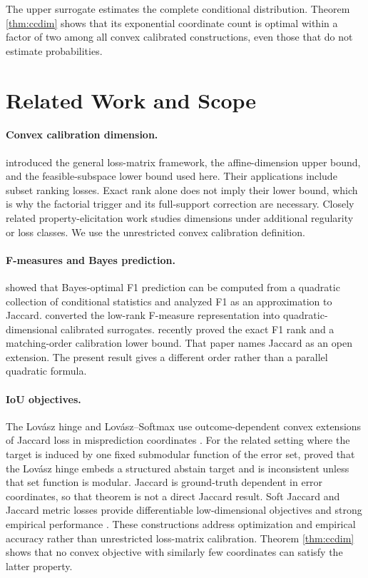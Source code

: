 \documentclass[twoside]{article}
\newcommand{\1}{\mathbf 1}
\begin{document}
The upper surrogate estimates the complete conditional distribution. Theorem \ref{thm:ccdim} shows that its exponential coordinate count is optimal within a factor of two among all convex calibrated constructions, even those that do not estimate probabilities.

\section{Related Work and Scope}

\paragraph{Convex calibration dimension.} \citet{ramaswamy2016convex} introduced the general loss-matrix framework, the affine-dimension upper bound, and the feasible-subspace lower bound used here. Their applications include subset ranking losses. Exact rank alone does not imply their lower bound, which is why the factorial trigger and its full-support correction are necessary. Closely related property-elicitation work studies dimensions under additional regularity or loss classes. We use the unrestricted convex calibration definition.

\paragraph{F-measures and Bayes prediction.} \citet{waegeman2014bayes} showed that Bayes-optimal F1 prediction can be computed from a quadratic collection of conditional statistics and analyzed F1 as an approximation to Jaccard. \citet{zhang2020convex} converted the low-rank F-measure representation into quadratic-dimensional calibrated surrogates. \citet{zhang2026exact} recently proved the exact F1 rank and a matching-order calibration lower bound. That paper names Jaccard as an open extension. The present result gives a different order rather than a parallel quadratic formula.

\paragraph{IoU objectives.} The Lov\'asz hinge and Lov\'asz--Softmax use outcome-dependent convex extensions of Jaccard loss in misprediction coordinates \citep{berman2018lovasz}. For the related setting where the target is induced by one fixed submodular function of the error set, \citet{finocchiaro2022structured} proved that the Lov\'asz hinge embeds a structured abstain target and is inconsistent unless that set function is modular. Jaccard is ground-truth dependent in error coordinates, so that theorem is not a direct Jaccard result. Soft Jaccard and Jaccard metric losses provide differentiable low-dimensional objectives and strong empirical performance \citep{wang2023jaccard}. These constructions address optimization and empirical accuracy rather than unrestricted loss-matrix calibration. Theorem \ref{thm:ccdim} shows that no convex objective with similarly few coordinates can satisfy the latter property.
\end{document}
